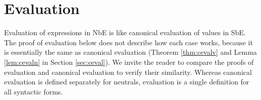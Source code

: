 \documentclass{llncs}
\newcommand{\refthm}[1]{Theorem \ref{thm:#1}}
\newcommand{\reflem}[1]{Lemma \ref{lem:#1}}
\newcommand{\refsec}[1]{Section \ref{sec:#1}}
\begin{document}
\clearpage

\section*{\appendixname}
\appendix

\section{Evaluation}
\label{sec:eval}

Evaluation of expressions in NbE is like canonical evaluation of
values in SbE. The proof of evaluation below does not describe how
each case works, because it is essentially the same as
canonical evaluation (\refthm{cevalv} and \reflem{cevaln} in
\refsec{ceval}). We invite the reader to compare the proofs of
evaluation and canonical evaluation to verify their similarity.
Whereas canonical evaluation is defined separately for neutrals,
evaluation is a single definition for all syntactic forms.
\end{document}

